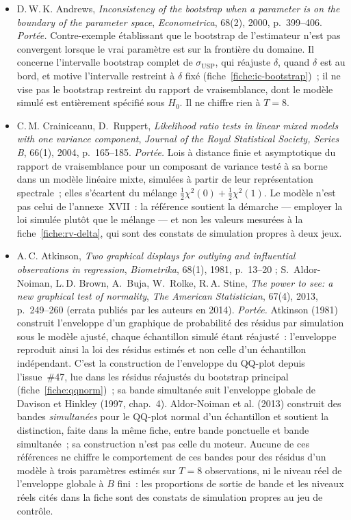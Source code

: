\documentclass[a4paper,11pt]{article}
\begin{document}
\begin{itemize}[itemsep=4pt]
  \item D.\,W.\,K. Andrews, \emph{Inconsistency of the bootstrap when a parameter
  is on the boundary of the parameter space}, \emph{Econometrica}, 68(2), 2000,
  p.~399--406.
  \emph{Portée.} Contre-exemple établissant que le bootstrap de l'estimateur
  n'est pas convergent lorsque le vrai paramètre est sur la frontière du domaine.
  Il concerne l'intervalle bootstrap complet de $\sigma_{\mathrm{USP}}$, qui
  réajuste $\delta$, quand $\delta$ est au bord, et motive l'intervalle
  restreint à $\delta$ fixé (fiche~\ref{fiche:ic-bootstrap})~; il ne vise pas le
  bootstrap restreint du rapport de vraisemblance, dont le modèle simulé est
  entièrement spécifié sous $H_0$. Il ne chiffre rien à $T = 8$.

  \item C.\,M. Crainiceanu, D.~Ruppert, \emph{Likelihood ratio tests in linear
  mixed models with one variance component}, \emph{Journal of the Royal
  Statistical Society, Series B}, 66(1), 2004, p.~165--185.
  \emph{Portée.} Lois à distance finie et asymptotique du rapport de
  vraisemblance pour un composant de variance testé à sa borne dans un modèle
  linéaire mixte, simulées à partir de leur représentation spectrale~; elles
  s'écartent du mélange $\tfrac12\chi^2(0) + \tfrac12\chi^2(1)$. Le modèle
  n'est pas celui de l'annexe~XVII~: la référence soutient la démarche --- employer
  la loi simulée plutôt que le mélange --- et non les valeurs mesurées à la
  fiche~\ref{fiche:rv-delta}, qui sont des constats de simulation propres à deux
  jeux.

  \item A.\,C. Atkinson, \emph{Two graphical displays for outlying and
  influential observations in regression}, \emph{Biometrika}, 68(1), 1981,
  p.~13--20 ; S.~Aldor-Noiman, L.\,D. Brown, A.~Buja, W.~Rolke, R.\,A. Stine,
  \emph{The power to see: a new graphical test of normality}, \emph{The
  American Statistician}, 67(4), 2013, p.~249--260 (errata publiés par les
  auteurs en 2014).
  \emph{Portée.} Atkinson (1981) construit l'enveloppe d'un graphique de
  probabilité des résidus par simulation sous le modèle ajusté, chaque
  échantillon simulé étant réajusté~: l'enveloppe reproduit ainsi la loi des
  résidus estimés et non celle d'un échantillon indépendant. C'est la
  construction de l'enveloppe du QQ-plot depuis l'issue~\#47, lue dans les
  résidus réajustés du bootstrap principal (fiche~\ref{fiche:qqnorm})~; sa bande
  simultanée suit l'enveloppe globale de Davison et Hinkley (1997, chap.~4).
  Aldor-Noiman et al. (2013) construit des bandes
  \emph{simultanées} pour le QQ-plot normal d'un échantillon et soutient la
  distinction, faite dans la même fiche, entre bande ponctuelle et bande
  simultanée~; sa construction n'est pas celle du moteur. Aucune de ces
  références ne chiffre le comportement de ces bandes pour des résidus
  d'un modèle à trois paramètres estimés sur $T = 8$ observations, ni le niveau
  réel de l'enveloppe globale à $B$ fini~: les proportions de sortie de bande et
  les niveaux réels cités dans la fiche sont des constats de simulation propres
  au jeu de contrôle.


\end{itemize}
\end{document}
